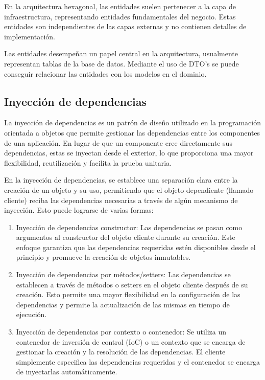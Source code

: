 \documentclass[executivepaper]{article}
\begin{document}
En la arquitectura hexagonal, las entidades suelen pertenecer a la capa de infraestructura, representando entidades fundamentales del negocio. Estas entidades son independientes de las capas externas y no contienen detalles de implementación.

Las entidades desempeñan un papel central en la arquitectura, usualmente representan tablas de la base de datos. Mediante el uso de DTO's se puede conseguir relacionar las entidades con los modelos en el dominio.

\subsection{Inyección de dependencias}

La inyección de dependencias es un patrón de diseño utilizado en la programación orientada a objetos que permite gestionar las dependencias entre los componentes de una aplicación. En lugar de que un componente cree directamente sus dependencias, estas se inyectan desde el exterior, lo que proporciona una mayor flexibilidad, reutilización y facilita la prueba unitaria.

En la inyección de dependencias, se establece una separación clara entre la creación de un objeto y su uso, permitiendo que el objeto dependiente (llamado cliente) reciba las dependencias necesarias a través de algún mecanismo de inyección. Esto puede lograrse de varias formas:

\begin{enumerate}
    \item Inyección de dependencias constructor: Las dependencias se pasan como argumentos al constructor del objeto cliente durante su creación. Este enfoque garantiza que las dependencias requeridas estén disponibles desde el principio y promueve la creación de objetos inmutables.
    \item Inyección de dependencias por métodos/setters: Las dependencias se establecen a través de métodos o setters en el objeto cliente después de su creación. Esto permite una mayor flexibilidad en la configuración de las dependencias y permite la actualización de las mismas en tiempo de ejecución.
    \item Inyección de dependencias por contexto o contenedor: Se utiliza un contenedor de inversión de control (IoC) o un contexto que se encarga de gestionar la creación y la resolución de las dependencias. El cliente simplemente especifica las dependencias requeridas y el contenedor se encarga de inyectarlas automáticamente.
\end{enumerate}
\end{document}
